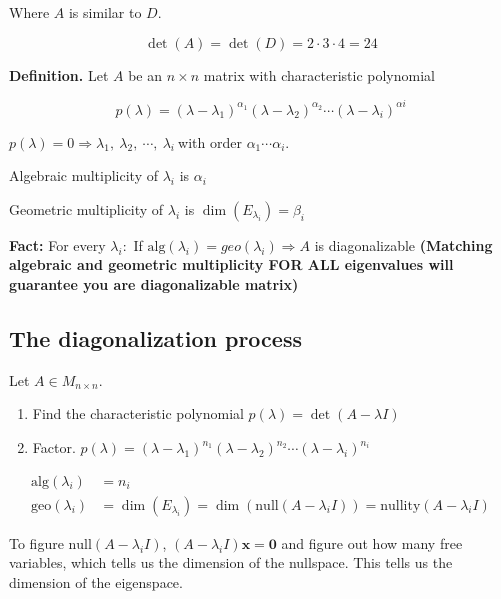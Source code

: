 \documentclass[
]{article}
\begin{document}
Where $A$ is similar to $D$.

$$\det(A) = \det(D) = 2 \cdot 3 \cdot 4 = 24$$

\textbf{Definition.} Let $A$ be an $n \times n$ matrix with
characteristic polynomial

$$p(\lambda) = \left( \lambda - \lambda_{1} \right)^{\alpha_{1}}\left( \lambda - \lambda_{2} \right)^{\alpha_{2}}\cdots\left( \lambda - \lambda_{i} \right)^{\alpha i}$$

$p(\lambda) = 0 \Rightarrow \lambda_{1},\ \lambda_{2},\ \cdots,\ \lambda_{i}\ $with
order $\alpha_{1}\cdots\alpha_{i}$.

Algebraic multiplicity of $\lambda_{i}$ is $\alpha_{i}$

Geometric multiplicity of $\lambda_{i}$ is
$\dim\left( E_{\lambda_{i}} \right) = \beta_{i}$

\textbf{Fact:} For every $\lambda_{i}:$ If
$\text{alg}\left( \lambda_{i} \right) = geo\left( \lambda_{i} \right) \Rightarrow A$
is diagonalizable \textbf{(Matching algebraic and geometric multiplicity
FOR ALL eigenvalues will guarantee you are diagonalizable matrix)}


\subsection{The diagonalization
process}

Let $A \in M_{n \times n}$.

\begin{enumerate}
\def\labelenumi{\arabic{enumi}.}
\item
  Find the characteristic polynomial
  $p(\lambda) = \det(A - \lambda I)$
\item
  Factor.
  $p(\lambda) = \left( \lambda - \lambda_{1} \right)^{n_{1}}\left( \lambda - \lambda_{2} \right)^{n_{2}}\cdots\left( \lambda - \lambda_{i} \right)^{n_{i}}$
\end{enumerate}

\begin{align*}
\text{alg}\left( \lambda_{i} \right) &= n_{i}
 \\
\text{geo}\left( \lambda_{i} \right) &= \dim\left( E_{\lambda_{i}} \right) = \dim\left( \text{null}\left( A - \lambda_{i}I \right) \right) = \text{nullity}\left( A - \lambda_{i}I \right)
\end{align*}


To figure $\text{null}\left( A - \lambda_{i}I \right)$,
$\left( A - \lambda_{i}I \right)\mathbf{x} = \mathbf{0}$ and
figure out how many free variables, which tells us the dimension of the
nullspace. This tells us the dimension of the eigenspace.
\end{document}
